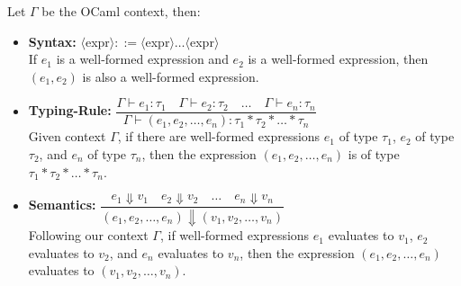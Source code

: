 \begin{Def}

    Let $\Gamma$ be the OCaml context, then:
    \begin{itemize}
        \item \textbf{Syntax:} \LARGE $\langle$expr$\rangle::=$\texttr{ (}$\langle$expr$\rangle$\texttr{,}$\dots$\texttr{,}$\langle$expr$\rangle$\texttr{)\normalsize}\normalsize\\
        
        \vspace{-.5em}
        \noindent
        If $e_1$ is a well-formed expression and $e_2$ is a well-formed expression, then $(e_1,e_2)$ is also a well-formed expression.

        \item \textbf{Typing-Rule:} \LARGE $\dfrac{\Gamma\vdash e_1:\tau_1 \quad \Gamma\vdash e_2:\tau_2 \quad \dots \quad \Gamma\vdash e_n:\tau_n}{\Gamma\vdash(e_1,e_2,\dots,e_n):\tau_1*\tau_2*\dots*\tau_n}$ \normalsize\\
        
        \noindent
        Given context $\Gamma$, if there are well-formed expressions $e_1$ of type $\tau_1$, $e_2$ of type $\tau_2$, and $e_n$ of type $\tau_n$, then the expression $(e_1,e_2,\dots,e_n)$ is of type $\tau_1*\tau_2*\dots*\tau_n$.

        \item \textbf{Semantics:} \LARGE $\dfrac{e_1\Downarrow v_1 \quad e_2\Downarrow v_2 \quad \dots \quad e_n\Downarrow v_n}{(e_1,e_2,\dots,e_n)\Downarrow(v_1,v_2,\dots,v_n)}$ \normalsize\\
        
        \noindent
        Following our context $\Gamma$, if well-formed expressions $e_1$ evaluates to $v_1$, $e_2$ evaluates to $v_2$, and $e_n$ evaluates to $v_n$, then the expression $(e_1,e_2,\dots,e_n)$ evaluates to $(v_1,v_2,\dots,v_n)$.
    \end{itemize}
\end{Def}

